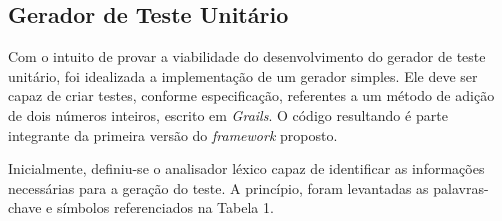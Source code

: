 \subsection{Gerador de Teste Unitário}
Com o intuito de provar a viabilidade do desenvolvimento do gerador de teste unitário, foi idealizada a implementação de um gerador simples. Ele deve ser capaz de criar testes, conforme especificação, referentes a um método de adição de dois números inteiros, escrito em \textit{Grails}. O código resultando é parte integrante da primeira versão do \textit{framework} proposto.
\par 
\indent Inicialmente, definiu-se o analisador léxico capaz de identificar as informações necessárias para a geração do teste. A princípio, foram levantadas as palavras-chave e símbolos referenciados na Tabela 1.

